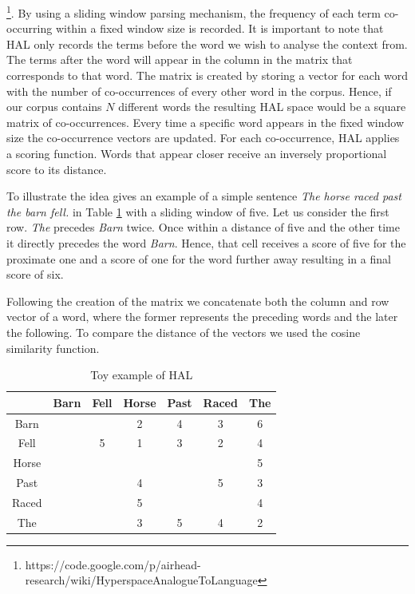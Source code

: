  \footnote{https://code.google.com/p/airhead-research/wiki/HyperspaceAnalogueToLanguage}. By using a sliding window parsing mechanism, the frequency of each term co-occurring within a fixed window size is recorded.  It is important to note that HAL only records the terms before the word we wish to analyse the context from. The terms after the word will appear in the column in the matrix that corresponds to that word.  The matrix is created by storing a vector for each word with the number of co-occurrences of every other word in the corpus. Hence, if our corpus contains $N$ different words the resulting HAL space would be a square matrix of co-occurrences. Every time a specific word appears in the fixed window size the co-occurrence vectors are updated. For each co-occurrence, HAL applies a scoring function. Words that appear closer receive an inversely proportional score to its distance.

 To illustrate the idea \cite{burgess98} gives an example of a simple sentence \emph {The horse raced past the barn fell.} in Table \ref{tab:halex} with a sliding window of five. Let us consider the first row.  \emph{The} precedes \emph{Barn} twice. Once within a distance of five and the other time it directly precedes the word  \emph{Barn}. Hence, that cell receives a score of five for the proximate one and a score of one for the word further away resulting in a final score of six. 

Following the creation of the matrix we concatenate both the column and row vector of a word, where the former represents the preceding words and the later the following. To compare the distance of the vectors we used the cosine similarity function. 


\begin{table}[H]
\centering
\begin{tabular}{ c c c c c c c} \toprule
  & Barn & Fell & Horse &  Past & Raced & The \\ 
  \hline
 Barn &  & & 2 &  4 & 3 & 6 \\ 
 Fell & & 5 & 1 &  3 & 2 & 4 \\ 
 Horse & & &  &   &  & 5 \\ 
 Past & & & 4 &   & 5 & 3 \\ 
 Raced & &  & 5 &   &  & 4 \\ 
 The & &  & 3 &  5 & 4 & 2 \\ 
   \bottomrule
\end{tabular}
\caption{Toy example of HAL}
\label{tab:halex}
\end{table}









